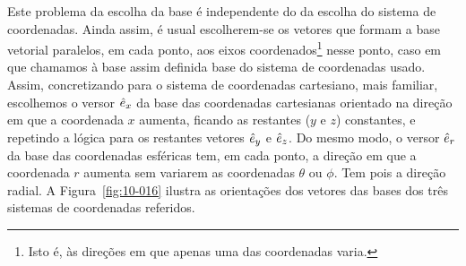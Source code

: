 Este problema da escolha da base é independente do da escolha do sistema de
coordenadas. Ainda assim, é usual escolherem-se os vetores que formam a base
vetorial paralelos, em cada ponto, aos eixos coordenados\footnote{Isto é, às
direções em que apenas uma das coordenadas varia.} nesse ponto, caso em
que chamamos à base assim definida base do sistema de coordenadas usado.
Assim, concretizando para o sistema de coordenadas cartesiano, mais familiar,
escolhemos o versor $\hat e_x$ da base das coordenadas cartesianas orientado na
direção em que a coordenada $x$ aumenta, ficando as restantes ($y$ e $z$)
constantes, e repetindo a lógica para os restantes vetores $\hat e_y$ e $\hat e_z$. Do
mesmo modo, o versor $\hat e_r$ da base das coordenadas esféricas tem, em cada
ponto, a direção em que a coordenada $r$ aumenta sem variarem as coordenadas
$\theta$ ou $\phi$. Tem pois a direção radial. A Figura~\ref{fig:10-016} ilustra
as orientações dos vetores das bases dos três sistemas de coordenadas referidos.
